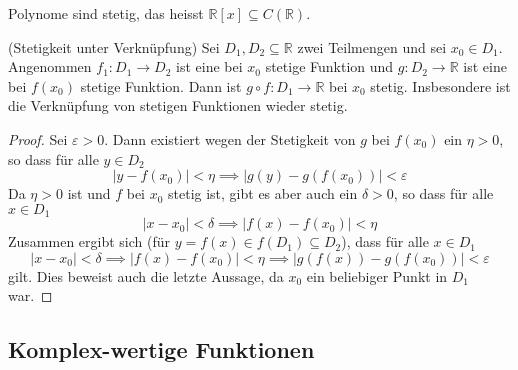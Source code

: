 \documentclass[../Analysis1_script.tex]{subfiles}
\begin{document}
\begin{corollary}
	Polynome sind stetig, das heisst $\mathbb{R}[x] \subseteq C(\mathbb{R})$.
\end{corollary}

\begin{proposition}{(Stetigkeit unter Verknüpfung)}
	Sei $D_1, D_2 \subseteq \mathbb{R}$ zwei Teilmengen und sei $x_0 \in D_1$. Angenommen $f_1: D_1 \to D_2$ ist eine bei $x_0$ stetige Funktion und $g: D_2 \to \mathbb{R}$ ist eine bei $f(x_0)$ stetige Funktion. Dann ist $g \circ f: D_1 \to \mathbb{R}$ bei $x_0$ stetig. Insbesondere ist die Verknüpfung von stetigen Funktionen wieder stetig.
\end{proposition}

\begin{proof}
	Sei $\varepsilon > 0$. Dann existiert wegen der Stetigkeit von $g$ bei $f(x_0)$ ein $\eta > 0$, so dass für alle $y \in D_2$
	\[|y - f(x_0)| < \eta \implies |g(y) - g(f(x_0))| < \varepsilon\]
	Da $\eta > 0$ ist und $f$ bei $x_0$ stetig ist, gibt es aber auch ein $\delta > 0$, so dass für alle $x \in D_1$
	\[|x - x_0| < \delta \implies |f(x) - f(x_0)| < \eta\]
	Zusammen ergibt sich (für $y = f(x) \in f(D_1) \subseteq D_2$), dass für alle $x \in D_1$
	\[|x - x_0| < \delta \implies |f(x) - f(x_0)| < \eta \implies |g(f(x)) - g(f(x_0))| < \varepsilon\]
	gilt. Dies beweist auch die letzte Aussage, da $x_0$ ein beliebiger Punkt in $D_1$ war.
\end{proof}
\subsection{Komplex-wertige Funktionen}
\end{document}
